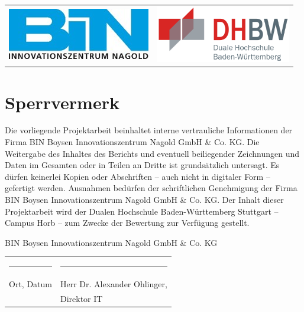 \begin{minipage}{\textwidth}
\begin{longtable}[l]{p{8.2cm} p{5.4cm}}
	\includegraphics{Abbildungen/BIN.jpg} & \includegraphics[height=2.5cm]{Abbildungen/dhbw.png}
\end{longtable}
\enlargethispage{20mm}
\vspace*{6mm}	
\chapter*{Sperrvermerk}
Die vorliegende Projektarbeit beinhaltet interne vertrauliche Informationen der Firma BIN Boysen Innovationszentrum Nagold GmbH \& Co. KG. Die Weitergabe des Inhaltes des Berichts und eventuell beiliegender Zeichnungen und Daten im Gesamten oder in Teilen an Dritte ist grundsätzlich untersagt. Es dürfen keinerlei Kopien oder Abschriften – auch nicht in digitaler Form – gefertigt werden. Ausnahmen bedürfen der schriftlichen Genehmigung der Firma BIN Boysen Innovationszentrum Nagold GmbH \& Co. KG. Der Inhalt dieser Projektarbeit wird der Dualen Hochschule Baden-Württemberg Stuttgart – Campus Horb – zum Zwecke der Bewertung zur Verfügung gestellt.

\vspace{2cm}
BIN Boysen Innovationszentrum Nagold GmbH \& Co. KG
\vspace{4cm}

\begin{tabular}{p{7.5cm}p{7.5cm}}
\rule{6cm}{0.4pt} & \rule{6cm}{0.4pt}\\
Ort, Datum & Herr Dr. Alexander Ohlinger,\\ & Direktor IT
\end{tabular}
\end{minipage}

